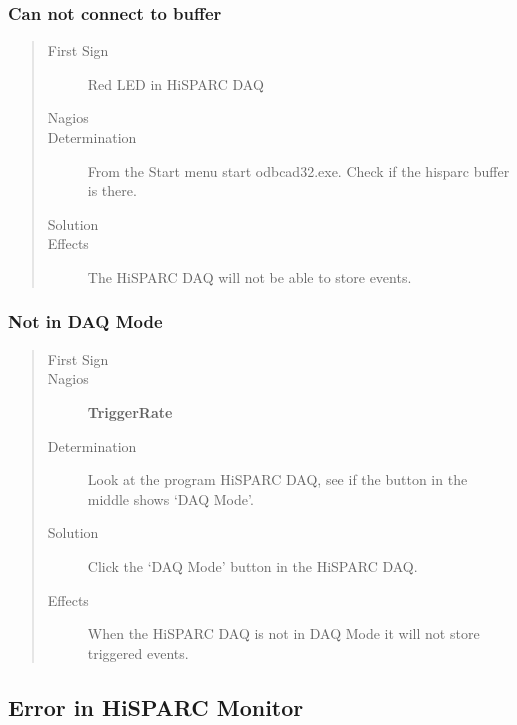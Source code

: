 \documentclass[a4paper,11pt,english]{sphinxmanual}
\begin{document}
\subsubsection{Can not connect to buffer}
\label{known-issues:can-not-connect-to-buffer}\begin{quote}\begin{description}
\item[{First Sign}] \leavevmode
Red LED in HiSPARC DAQ

\item[{Nagios}] \leavevmode
\item[{Determination}] \leavevmode
From the Start menu start odbcad32.exe. Check if the
hisparc buffer is there.

\item[{Solution}] \leavevmode
\item[{Effects}] \leavevmode
The HiSPARC DAQ will not be able to store events.

\end{description}\end{quote}


\subsubsection{Not in DAQ Mode}
\label{known-issues:not-in-daq-mode}\begin{quote}\begin{description}
\item[{First Sign}] \leavevmode
\item[{Nagios}] \leavevmode
\textbf{TriggerRate}

\item[{Determination}] \leavevmode
Look at the program HiSPARC DAQ, see if the button in the
middle shows `DAQ Mode'.

\item[{Solution}] \leavevmode
Click the `DAQ Mode' button in the HiSPARC DAQ.

\item[{Effects}] \leavevmode
When the HiSPARC DAQ is not in DAQ Mode it will not store
triggered events.

\end{description}\end{quote}


\subsection{Error in HiSPARC Monitor}
\label{known-issues:error-in-hisparc-monitor}
\end{document}
